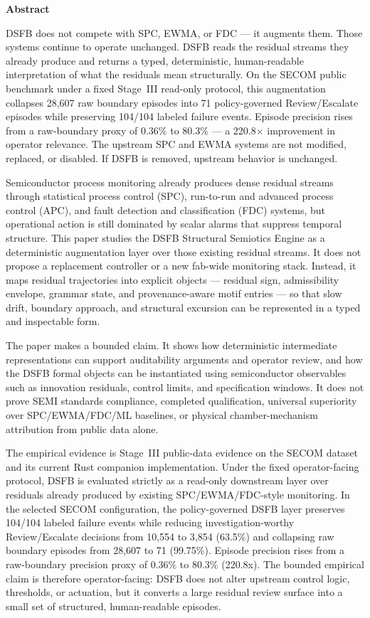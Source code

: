 \documentclass[11pt,letterpaper]{article}
\theoremstyle{scresult}
\begin{document}
\begin{center}
\begin{minipage}{0.88\linewidth}
\begin{center}
\textbf{Abstract}
\end{center}
\small
DSFB does not compete with SPC, EWMA, or FDC --- it augments them. Those
systems continue to operate unchanged. DSFB reads the residual streams they
already produce and returns a typed, deterministic, human-readable
interpretation of what the residuals mean structurally. On the SECOM public
benchmark under a fixed Stage~III read-only protocol, this augmentation
collapses 28{,}607 raw boundary episodes into 71 policy-governed
Review/Escalate episodes while preserving 104/104 labeled failure events.
Episode precision rises from a raw-boundary proxy of 0.36\% to 80.3\% ---
a 220.8$\times$ improvement in operator relevance. The upstream SPC and EWMA
systems are not modified, replaced, or disabled. If DSFB is removed, upstream
behavior is unchanged.

Semiconductor process monitoring already produces dense residual streams through
statistical process control (SPC), run-to-run and advanced process control
(APC), and fault detection and classification (FDC) systems, but operational
action is still dominated by scalar alarms that suppress temporal structure.
This paper studies the DSFB Structural Semiotics Engine as a deterministic
augmentation layer over those existing residual streams. It does not propose a
replacement controller or a new fab-wide monitoring stack. Instead, it maps
residual trajectories into explicit objects --- residual sign, admissibility
envelope, grammar state, and provenance-aware motif entries --- so that slow
drift, boundary approach, and structural excursion can be represented in a
typed and inspectable form.

The paper makes a bounded claim. It shows how deterministic intermediate
representations can support auditability arguments and operator review, and how
the DSFB formal objects can be instantiated using semiconductor observables such
as innovation residuals, control limits, and specification windows. It does not
prove SEMI standards compliance, completed qualification, universal superiority
over SPC/EWMA/FDC/ML baselines, or physical chamber-mechanism attribution from
public data alone.

The empirical evidence is Stage~III public-data evidence on the SECOM
dataset and its current Rust companion implementation. Under the fixed
operator-facing protocol, DSFB is evaluated strictly as a read-only downstream
layer over residuals already produced by existing SPC/EWMA/FDC-style
monitoring. In the selected SECOM configuration, the policy-governed DSFB
layer preserves 104/104 labeled failure events while reducing
investigation-worthy Review/Escalate decisions from 10{,}554 to 3{,}854
(63.5\%) and collapsing raw boundary episodes from 28{,}607 to 71
(99.75\%). Episode precision rises from a raw-boundary precision proxy of
0.36\% to 80.3\% (220.8x). The bounded empirical claim is therefore
operator-facing: DSFB does not alter upstream control logic, thresholds, or
actuation, but it converts a large residual review surface into a small set of
structured, human-readable episodes.


\end{minipage}
\end{center}
\end{document}
